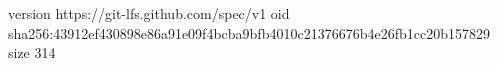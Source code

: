 version https://git-lfs.github.com/spec/v1
oid sha256:43912ef430898e86a91e09f4bcba9bfb4010c21376676b4e26fb1cc20b157829
size 314
